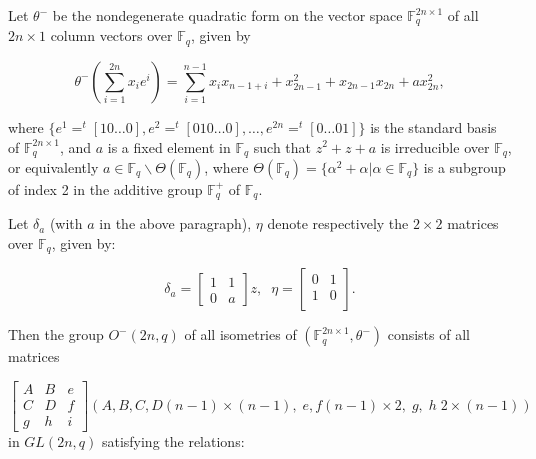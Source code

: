 \documentclass[a4,12pt]{elsart}
\begin{document}
Let $\theta^-$ be the nondegenerate quadratic form on the vector
space ${\mathbb{F}}_q^{2n \times 1}$ of all $2n \times 1$ column vectors over
${\mathbb{F}}_q$, given by

\begin{equation}\label{a9}
\theta^{-}(\sum_{i=1}^{2n} x_i e^i) = \sum_{i=1}^{n-1}
x_{i}x_{n-1+i}+x^{2}_{2n-1}+x_{2n-1}x_{2n}+ax^{2}_{2n},
\end{equation}

where $\{e^1=^t[10\ldots0],
e^2=^t[010\ldots0],\ldots,e^{2n}=^t[0\ldots01]\}$ is the standard
basis of ${\mathbb{F}}_q^{2n \times 1}$, and $a$ is a fixed element in
${\mathbb{F}}_q$ such that $z^2+z+a$ is irreducible over ${\mathbb{F}}_q$, or
equivalently $a \in {\mathbb{F}}_q \backslash \Theta({\mathbb{F}}_q)$, where
$\Theta({\mathbb{F}}_q) =\{ \alpha^{2}+\alpha |\alpha \in {\mathbb{F}}_q \}$ is a
subgroup of index 2 in the additive group ${\mathbb{F}}_q^{+}$ of ${\mathbb{F}}_q$.

Let $\delta_a$ (with $a$ in the above paragraph), $\eta$ denote
respectively the $2\times 2$ matrices over ${\mathbb{F}}_q$, given by:

\begin{equation}\label{a10}
\delta_{a}=
                  \begin{bmatrix}
                   1 & 1 \\
                   0 & a
                  \end{bmatrix}
 z, \;\; \eta =
\begin{bmatrix}
  0 & 1 \\
  1 & 0 \\
\end{bmatrix}
.
\end{equation}

Then the group $O^{-}(2n,q)$ of all isometries of $({\mathbb{F}}_q^{2n \times
1}, \theta^{-})$ consists of all matrices

\begin{equation}\label{a11}
\begin{bmatrix}
  A & B & e \\
  C & D & f \\
  g & h & i
\end{bmatrix}
 (A, B, C, D(n-1) \times (n-1), \; e, f(n-1) \times 2,\; g, \; h \; 2
\times (n-1))
\end{equation}
in $GL(2n,q)$ satisfying the relations:\\
\end{document}
